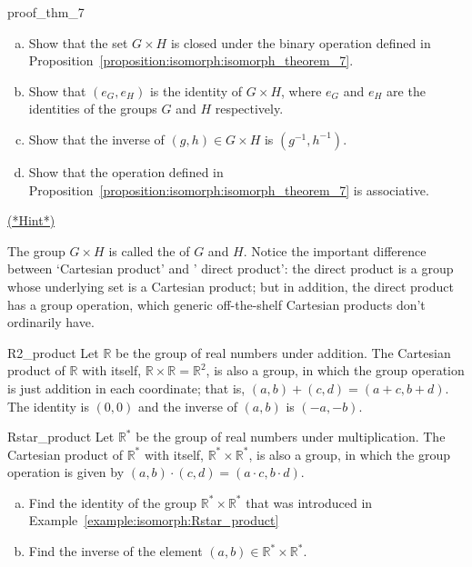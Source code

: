 \begin{exercise}{proof_thm_7}
\begin{enumerate}[(a)]
\item
Show that the set $G \times H$ is closed under the binary operation defined in Proposition~\ref{proposition:isomorph:isomorph_theorem_7}. 
\item Show that $(e_G, e_H)$ is the identity of $G \times H$,
where $e_G$ and $e_H$ are the identities of the groups $G$ and $H$ respectively.
\item Show that the inverse of $(g, h) \in G \times H$ is $(g^{-1}, h^{-1})$.  
\item Show that the operation defined in Proposition~\ref{proposition:isomorph:isomorph_theorem_7} is associative.
\end{enumerate}
\hyperref[sec:isomorph:hints]{(*Hint*)}
\end{exercise}

The group $G \times H$ is called the  of  $G$ and $H$. Notice the important difference between `Cartesian product' and ' direct product': the  direct product is a group whose underlying set is a Cartesian product; but in addition, the  direct product has a group operation, which generic off-the-shelf Cartesian products don't ordinarily have. 

\begin{example}{R2_product}
Let ${\mathbb R}$ be the group of real numbers under addition.  The Cartesian product of ${\mathbb R}$ with itself, ${\mathbb R} \times {\mathbb R} = {\mathbb R}^2$, is also a group, in which the group operation is just addition in each coordinate; that is, $(a, b) + (c, d) = (a + c, b + d)$.  The identity is $(0,0)$ and the inverse of $(a, b)$ is $(-a, -b)$.
\end{example}

\begin{example}{Rstar_product}
Let ${\mathbb R}^*$ be the group of real numbers under multiplication.  The Cartesian product of ${\mathbb R}^*$ with itself, ${\mathbb R}^* \times {\mathbb R}^* $, is also a group, in which the group operation is given by $(a, b) \cdot  (c, d) = (a \cdot  c, b \cdot  d)$.  \end{example}

\begin{exercise}{}
\begin{enumerate}[(a)]
\item
Find the identity of the group ${\mathbb R}^* \times {\mathbb R}^* $ that was introduced in Example~\ref{example:isomorph:Rstar_product}
\item
Find the inverse of the element  $(a,b) \in {\mathbb R}^* \times {\mathbb R}^* $.
\end{enumerate}
\end{exercise}

